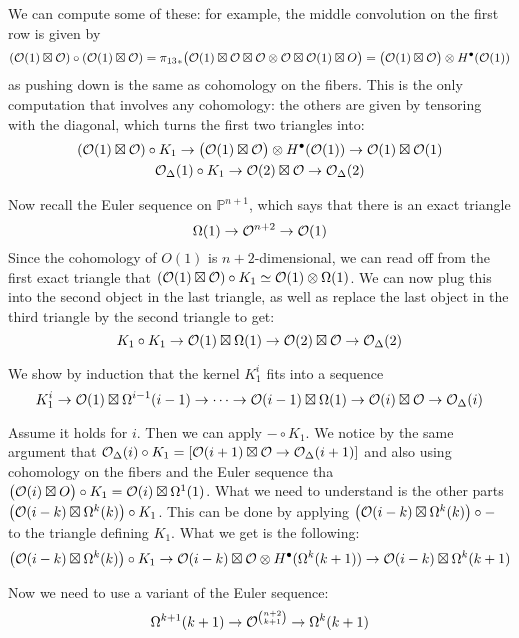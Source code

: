 We can compute some of these: for example, the middle convolution on the first row is given by $$(\mathcal{O}(1)\boxtimes \mathcal{O})  \circ (\mathcal{O}(1)\boxtimes \mathcal{O}) ={\pi_{13}}_*\big(\mathcal{O}(1)\boxtimes \mathcal{O} \boxtimes \mathcal{O} \otimes \mathcal{O} \boxtimes \mathcal{O}(1) \boxtimes O\big)=\big(\mathcal{O}(1)\boxtimes \mathcal{O}\big) \otimes H^\bullet(\mathcal{O}(1))$$
as pushing down is the same as cohomology on the fibers. This is the only computation that involves any cohomology: the others are given by tensoring with the diagonal, which turns the first two triangles into: \begin{gather*}
    (\mathcal{O}(1)\boxtimes \mathcal{O}) \circ K_1 \rightarrow \big(\mathcal{O}(1)\boxtimes \mathcal{O}\big) \otimes H^\bullet(\mathcal{O}(1)) \rightarrow \mathcal{O}(1)\boxtimes \mathcal{O}(1)\\
    \mathcal{O}_\Delta(1)\circ K_1 \rightarrow \mathcal{O}(2)\boxtimes \mathcal{O} \rightarrow \mathcal{O}_\Delta(2)
\end{gather*}

Now recall the Euler sequence on $\mathbb{P}^{n+1}$, which says that there is an exact triangle $$\Omega(1)\rightarrow \mathcal{O}^{n+2}\rightarrow \mathcal{O}(1)$$
Since the cohomology of $O(1)$ is $n+2$-dimensional, we can read off from the first exact triangle that $ (\mathcal{O}(1)\boxtimes \mathcal{O}) \circ K_1\simeq \mathcal{O}(1) \otimes \Omega(1)$. We can now plug this into the second object in the last triangle, as well as replace the last object in the third triangle by the second triangle to get: $$K_1 \circ K_1 \rightarrow \mathcal{O}(1)\boxtimes \Omega(1)\rightarrow \mathcal{O}(2)\boxtimes \mathcal{O} \rightarrow \mathcal{O}_\Delta(2)$$

We show by induction that the kernel $K_1^i$ fits into a sequence $$K_1^i\rightarrow \mathcal{O}(1)\boxtimes \Omega^{i-1}(i-1)\rightarrow \dots \rightarrow \mathcal{O}(i-1)\boxtimes \Omega(1)\rightarrow \mathcal{O}(i)\boxtimes \mathcal{O} \rightarrow \mathcal{O}_\Delta(i)$$

Assume it holds for $i$. Then we can apply $-\circ K_1$. We notice by the same argument that $\mathcal{O}_\Delta(i)\circ K_1= [\mathcal{O}(i+1)\boxtimes \mathcal{O} \rightarrow \mathcal{O}_\Delta(i+1)]$ and also using cohomology on the fibers and the Euler sequence tha $\big( \mathcal{O}(i)\boxtimes O\big)\circ K_1=\mathcal{O}(i)\boxtimes \Omega^1(1)$. What we need to understand is the other parts $\big(\mathcal{O}(i-k)\boxtimes \Omega^{k}(k)\big) \circ K_1$. This can be done by applying $\big(\mathcal{O}(i-k)\boxtimes \Omega^k(k)\big)\circ -$ to the triangle defining $K_1$. What we get is the following: $$\big(\mathcal{O}(i-k)\boxtimes \Omega^k(k)\big)\circ K_1 \rightarrow \mathcal{O}(i-k)\boxtimes \mathcal{O} \otimes H^\bullet(\Omega^k(k+1))\rightarrow \mathcal{O}(i-k)\boxtimes \Omega^k(k+1)$$

Now we need to use a variant of the Euler sequence: $$\Omega^{k+1}(k+1)\rightarrow \mathcal{O}^{\binom{n+2}{k+1}}\rightarrow \Omega^k(k+1)$$

